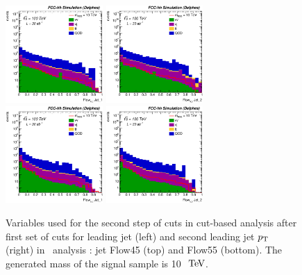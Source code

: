 \begin{figure}[!htb]\centering
\includegraphics[width=0.33\textwidth]{Fig/RSGww/Jet1_Flow45_sel1_nostack_log.eps}
\includegraphics[width=0.33\textwidth]{Fig/RSGww/Jet2_Flow45_sel1_nostack_log.eps}
\includegraphics[width=0.33\textwidth]{Fig/RSGww/Jet1_Flow55_sel1_nostack_log.eps}
\includegraphics[width=0.33\textwidth]{Fig/RSGww/Jet2_Flow55_sel1_nostack_log.eps}
\caption{Variables used for the second step of cuts in cut-based analysis after first set of cuts for leading jet (left) and second leading jet $p\sb{\scriptstyle\mathrm{T}}$ (right) in \rsg\ analysis : jet Flow45 (top) and Flow55 (bottom). The generated mass of the signal sample is 10 $\TeV$.}
\label{fig:RSGww_sel1_cut}
\end{figure}

